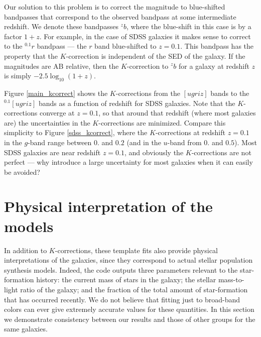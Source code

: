 \documentclass[10pt,preprint]{aastex}
\newcommand{\band}[2]{\ensuremath{^{{#1}}\!{#2}}}
\begin{document}
Our solution to this problem is to correct the magnitude to
blue-shifted bandpasses that correspond to the observed bandpass at
some intermediate redshift. We denote these bandpasses \band{z}{b},
where the blue-shift in this case is by a factor $1+z$. For example,
in the case of SDSS galaxies it makes sense to correct to the
\band{0.1}{r} bandpass --- the $r$ band blue-shifted to $z=0.1$. This
bandpass has the property that the $K$-correction is independent of
the SED of the galaxy. If the magnitudes are AB relative, then the
$K$-correction to \band{z}{b} for a galaxy at redshift $z$ is simply
$-2.5\log_{10} (1+z)$.

Figure \ref{main_kcorrect} shows the $K$-corrections from the
$[ugriz]$ bands to the $\band{0.1}{[ugriz]}$ bands as a function of
redshift for SDSS galaxies. Note that the $K$-corrections converge at
$z=0.1$, so that around that redshift (where most galaxies are) the
uncertainties in the $K$-corrections are minimized. Compare this
simplicity to Figure \ref{sdss_kcorrect}, where the $K$-corrections at
redshift $z=0.1$ in the $g$-band range between $0.$ and $0.2$ (and in
the $u$-band from $0.$ and $0.5$). Most SDSS galaxies are near
redshift $z=0.1$, and obviously the $K$-corrections are not perfect
--- why introduce a large uncertainty for most galaxies when it can
easily be avoided?

\section{Physical interpretation of the models}
\label{physical}

In addition to $K$-corrections, these template fits also provide
physical interpretations of the galaxies, since they correspond to
actual stellar population synthesis models. Indeed, the code outputs
three parameters relevant to the star-formation history: the current
mass of stars in the galaxy; the stellar mass-to-light ratio of the
galaxy; and the fraction of the total amount of star-formation that
has occurred recently. We do not believe that fitting just to
broad-band colors can ever give extremely accurate values for these
quantities. In this section we demonstrate consistency between our
results and those of other groups for the same galaxies. 
\end{document}
